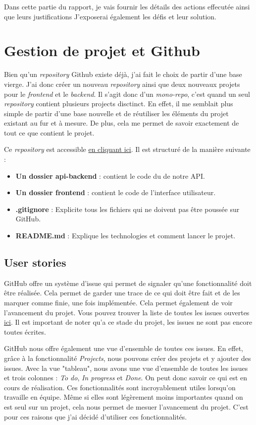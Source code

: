 Dans cette partie du rapport, je vais fournir les détails des actions effecutée ainsi que leurs justifications J'exposerai également les défis et leur solution.
\section{Gestion de projet et Github}
Bien qu'un \emph{repository} Github existe déjà, j'ai fait le choix de partir d'une base vierge. J'ai donc créer un nouveau \emph{repository} ainsi que deux nouveaux projets pour le \emph{frontend} et le \emph{backend}. Il s'agit donc d'un \emph{mono-repo}, c'est quand un seul \emph{repository} contient plusieurs projects disctinct. En effet, il me semblait plus simple de partir d'une base nouvelle et de réutiliser les éléments du projet existant au fur et à mesure. De plus, cela me permet de savoir exactement de tout ce que contient le projet.

Ce \emph{repository} est accessible \href{https://github.com/Marinlestylo/h-quiz}{en cliquant ici}. Il est structuré de la manière suivante :
\begin{itemize}
    \item \textbf{Un dossier api-backend} : contient le code du de notre API.
    \item \textbf{Un dossier frontend} : contient le code de l'interface utilisateur.
    \item \textbf{.gitignore} : Explicite tous les fichiers qui ne doivent pas être poussée sur GitHub.
    \item \textbf{README.md} : Explique les technologies et comment lancer le projet.
\end{itemize}

\subsection{User stories}
GitHub offre un système d'issue qui permet de signaler qu'une fonctionnalité doit être réalisée. Cela permet de garder une trace de ce qui doit être fait et de les marquer comme finie, une fois implémentée. Cela permet également de voir l'avancement du projet. Vous pouvez trouver la liste de toutes les issues ouvertes \href{https://github.com/Marinlestylo/h-quiz/issues}{ici}. Il est important de noter qu'a ce stade du projet, les issues ne sont pas encore toutes écrites.

GitHub nous offre également une vue d'ensemble de toutes ces issues. En effet, grâce à la fonctionnalité \emph{Projects}, nous pouvons créer des projets et y ajouter des issues. Avec la vue "tableau", nous avons une vue d'ensemble de toutes les issues et trois colonnes : \emph{To do}, \emph{In progress} et \emph{Done}. On peut donc savoir ce qui est en cours de réalisation. Ces fonctionnalités sont incroyablement utiles lorsqu'on travaille en équipe. Même si elles sont légèrement moins importantes quand on est seul sur un projet, cela nous permet de mesuer l'avancement du projet. C'est pour ces raisons que j'ai décidé d'utiliser ces fonctionnalités.

